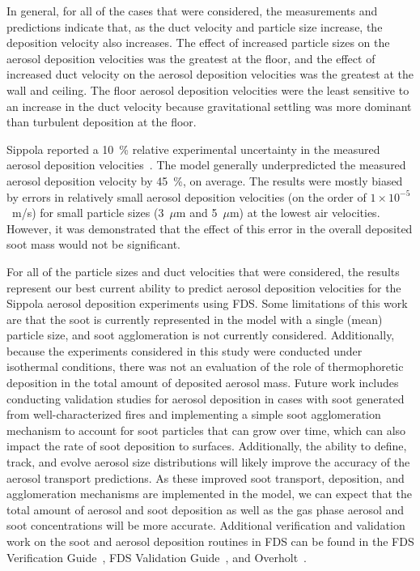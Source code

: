In general, for all of the cases that were considered, the measurements and predictions indicate that, as the duct velocity and particle size increase, the deposition velocity also increases. The effect of increased particle sizes on the aerosol deposition velocities was the greatest at the floor, and the effect of increased duct velocity on the aerosol deposition velocities was the greatest at the wall and ceiling. The floor aerosol deposition velocities were the least sensitive to an increase in the duct velocity because gravitational settling was more dominant than turbulent deposition at the floor.

Sippola reported a 10~\% relative experimental uncertainty in the measured aerosol deposition velocities~\cite{Sippola:2002}. The model generally underpredicted the measured aerosol deposition velocity by 45~\%, on average. The results were mostly biased by errors in relatively small aerosol deposition velocities (on the order of $1 \times 10^{-5}$~m/s) for small particle sizes (3~$\mu$m and 5~$\mu$m) at the lowest air velocities. However, it was demonstrated that the effect of this error in the overall deposited soot mass would not be significant.

For all of the particle sizes and duct velocities that were considered, the results represent our best current ability to predict aerosol deposition velocities for the Sippola aerosol deposition experiments using FDS. Some limitations of this work are that the soot is currently represented in the model with a single (mean) particle size, and soot agglomeration is not currently considered. Additionally, because the experiments considered in this study were conducted under isothermal conditions, there was not an evaluation of the role of thermophoretic deposition in the total amount of deposited aerosol mass. Future work includes conducting validation studies for aerosol deposition in cases with soot generated from well-characterized fires and implementing a simple soot agglomeration mechanism to account for soot particles that can grow over time, which can also impact the rate of soot deposition to surfaces. Additionally, the ability to define, track, and evolve aerosol size distributions will likely improve the accuracy of the aerosol transport predictions. As these improved soot transport, deposition, and agglomeration mechanisms are implemented in the model, we can expect that the total amount of aerosol and soot deposition as well as the gas phase aerosol and soot concentrations will be more accurate. Additional verification and validation work on the soot and aerosol deposition routines in FDS can be found in the FDS Verification Guide~\cite{FDS_Verification_Guide}, FDS Validation Guide~\cite{FDS_Validation_Guide}, and Overholt~\cite{Overholt:Dissertation}.

